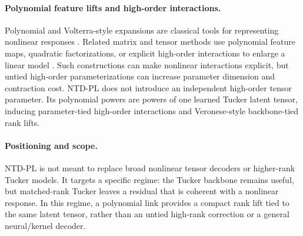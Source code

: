 \paragraph{Polynomial feature lifts and high-order interactions.}
Polynomial and Volterra-style expansions are classical tools for representing
nonlinear responses \citep{Volterra1959Theory,Boyd1985FadingMemory}. Related
matrix and tensor methods use polynomial feature maps, quadratic
factorizations, or explicit high-order interactions to enlarge a linear model
\citep{zhai2024quadratic,Ruegamer2024AISTATS,liu2015model,deng2016storm}.
Such constructions can make nonlinear interactions explicit, but untied
high-order parameterizations can increase parameter dimension and contraction
cost. NTD-PL does not introduce an independent high-order tensor parameter. Its
polynomial powers are powers of one learned Tucker latent tensor, inducing
parameter-tied high-order interactions and Veronese-style backbone-tied rank
lifts.

\paragraph{Positioning and scope.}
NTD-PL is not meant to replace broad nonlinear tensor decoders or higher-rank Tucker models.
It targets a specific regime: the Tucker backbone remains useful, but matched-rank Tucker leaves
a residual that is coherent with a nonlinear response. In this regime, a polynomial link provides
a compact rank lift tied to the same latent tensor, rather than an untied high-rank correction or a
general neural/kernel decoder.
